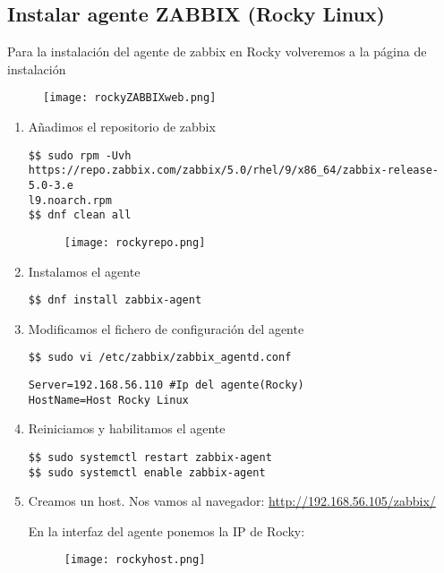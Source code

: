 \subsection{Instalar agente ZABBIX (Rocky Linux)}
Para la instalación del agente de zabbix en Rocky volveremos a la página de instalación \cite{zabbixRocky}

\begin{figure}[H]
	\centering
	\texttt{[image: rockyZABBIXweb.png]} 
\end{figure}

\begin{enumerate}
	\item Añadimos el repositorio de zabbix
	\begin{verbatim}
$$ sudo rpm -Uvh https://repo.zabbix.com/zabbix/5.0/rhel/9/x86_64/zabbix-release-5.0-3.e
l9.noarch.rpm
$$ dnf clean all
	\end{verbatim}
\begin{figure}[H]
	\centering
	\texttt{[image: rockyrepo.png]} 
\end{figure}

	\item Instalamos el agente
	\begin{verbatim}
$$ dnf install zabbix-agent
	\end{verbatim}

	\item Modificamos el fichero de configuración del agente
	\begin{verbatim}
$$ sudo vi /etc/zabbix/zabbix_agentd.conf
	\end{verbatim}
\begin{verbatim}
Server=192.168.56.110 #Ip del agente(Rocky)
HostName=Host Rocky Linux
\end{verbatim}
	\item Reiniciamos y habilitamos el agente
	\begin{verbatim}
$$ sudo systemctl restart zabbix-agent
$$ sudo systemctl enable zabbix-agent
	\end{verbatim}

	\item Creamos un host. Nos vamos al navegador: \url{http://192.168.56.105/zabbix/} \\
\begin{minipage}{4cm}
\end{minipage}

En la interfaz del agente ponemos la IP de Rocky:
\begin{figure}[H]
	\centering
	\texttt{[image: rockyhost.png]} 
\end{figure}

\end{enumerate}

